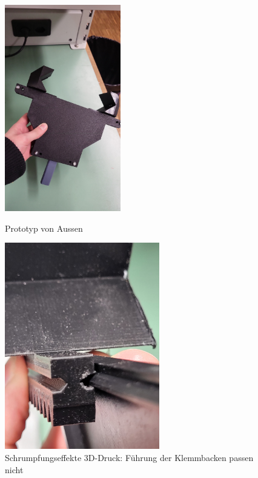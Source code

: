 \documentclass[../main.tex]{subfiles}
\begin{document}
\newpage
\begin{figure}[h!]
    \centering
    \begin{minipage}[t]{0.45\textwidth}
        \centering
        \includegraphics[height=9cm]{img/greifarmtest/prototyp_test_fertig.jpeg}
        \caption{Prototyp von Aussen}
        \label{fig:hardware_test_fertig}
    \end{minipage}%
    \hfill
    \begin{minipage}[t]{0.45\textwidth}
        \centering
        \includegraphics[height=9cm]{img/greifarmtest/prototyp_test_klemmen_gleiten.jpeg}
        \caption{Schrumpfungseffekte 3D-Druck: Führung der Klemmbacken passen nicht}
        \label{fig:hardware_test_klemmen_gleiten}
    \end{minipage}
\end{figure}
\end{document}
